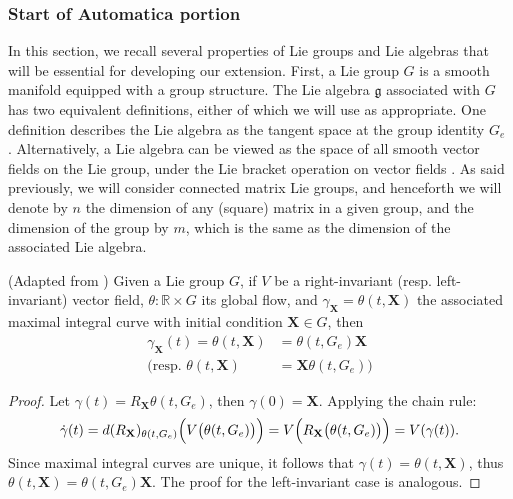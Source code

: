 \subsubsection{Start of Automatica portion}
In this section, we recall several properties of Lie groups and Lie algebras that will be essential for developing our extension. First, a Lie group $G$ is a smooth manifold equipped with a group structure. The Lie algebra $\mathfrak{g}$ associated with $G$ has two equivalent definitions, either of which we will use as appropriate. One definition describes the Lie algebra as the tangent space at the group identity $G_e$ \citep[p. 16]{Gallier2020}. Alternatively, a Lie algebra can be viewed as the space of all smooth vector fields on the Lie group, under the Lie bracket operation on vector fields \citep[p. 190]{Lee2012}. As said previously, we will consider connected matrix Lie groups, and henceforth we will denote by $n$ the dimension of any (square) matrix in a given group, and the dimension of the group by $m$, which is the same as the dimension of the associated Lie algebra.

\begin{lemma}\label{lemma:lie-group-flow}
    (Adapted from \citet[p. 570]{Gallier2020}) Given a Lie group $G$, if $V$ be a right-invariant (resp. left-invariant) vector field, $\theta:\mathbb{R}\times G$ its global flow, and $\gamma_\mathbf{X}=\theta(t, \mathbf{X})$ the associated maximal integral curve with initial condition $\mathbf{X}\in G$, then
    \begin{align*}
        \gamma_\mathbf{X}(t) = \theta(t, \mathbf{X}) &=  \theta(t, G_e)\mathbf{X}\\
        \bigl(\text{resp. }\theta(t, \mathbf{X}) &=  \mathbf{X}\theta(t, G_e)\bigr)
    \end{align*}
\end{lemma}
\begin{proof}
    Let $\gamma(t) = R_{\mathbf{X}}\theta(t, G_e)$, then $\gamma(0) = \mathbf{X}$. Applying the chain rule:
    \begin{align}
        \dot{\gamma}(t) = d(R_{\mathbf{X}})_{\theta(t, G_e)}\Bigl(V\bigl(\theta(t, G_e)\bigr)\Bigr) = V\Bigl(R_{\mathbf{X}}\bigl(\theta(t, G_e)\bigr)\Bigr) = V(\gamma(t)).
    \end{align}
    Since maximal integral curves are unique, it follows that $\gamma(t) = \theta(t, \mathbf{X})$, thus $\theta(t, \mathbf{X}) = \theta(t, G_e)\mathbf{X}$. The proof for the left-invariant case is analogous.
\end{proof}

